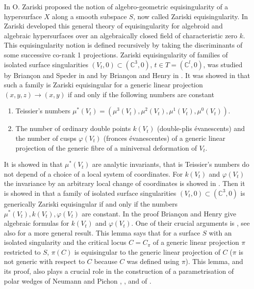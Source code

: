 \documentclass[11pt,a4paper]{amsart}
\newcommand{\1}{{1\!\!1}}
\numberwithin{equation}{section}
\theoremstyle{plain}%
\theoremstyle{definition}
\theoremstyle{definition}
\theoremstyle{remark}
\newcommand{\C}{\mathbb{C}}
\newcommand{\kk}{{k}}
\renewcommand{\1}{\mathbf{1}}
\DeclareMathOperator{\mult}{mult}
\begin{document}
In \cite[Definition 3] {zariski71open} O. Zariski proposed the notion of  algebro-geometric equisingularity of a hypersurface $X$ along a smooth subspace $S$, now called Zariski equisingularity. In \cite{Zariski1979} Zariski developed this general theory of equisingularity for algebroid and  algebraic hypersurfaces over an algebraically closed field of characteristic zero $\kk$.  This equisingularity notion is defined recursively by taking  the discriminants of some successive co-rank 1 projections. 
Zariski equisingularity of families of isolated surface singularities $(V_t,0)\subset (\C^3,0)$, $t\in T=(\C^l,0)$, was studied by Briançon and Speder  in 
\cite{brianconspederthese} and by Briançon and Henry  in \cite{brianconhenry80}. It was showed in \cite[Théorème 3.5.3]{brianconspederthese} that such a family is Zariski equisingular for a generic linear projection $(x,y,z) \to (x,y)$ if and only if the following numbers are constant
\begin{enumerate}[label=(\roman*)]
  \item 
Teissier's numbers $
\mu^*(V_t) = (\mu^3(V_t),\mu^2(V_t),\mu^1(V_t),\mu^0(V_t)). 
$
\item 
The number of ordinary double points $k(V_t)$ (double-plis évanescents) and the number of cusps 
$\varphi (V_t)$ (fronces évanescentes) of a generic linear projection of the generic fibre of a miniversal deformation of $V_t$.  
\end{enumerate}


It is showed in \cite[Proposition 2. 10]{teissierasterisque73} that $\mu^*(V_t)$ are analytic invariants, that is Teissier's numbers do not depend of a choice of a local system of coordinates.  For $k(V_t)$ and $\varphi (V_t)$ the invariance by an arbitrary local change of coordinates is showed in \cite{brianconhenry80}. Then it is showed in \cite[Théorème 4.1]{brianconhenry80} that a family of isolated surface singularities $(V_t,0)\subset (\C^3,0)$ is generically Zariski equisingular if and only if the numbers $\mu^*(V_t), k(V_t), \varphi (V_t)$ are constant.  In the proof Briançon and Henry give algebraic formulas for $ k(V_t)$ and $ \varphi (V_t)$.  One of their crucial arguments is  \cite[Lemme 3.7]{brianconhenry80}, see also \cite[Lemme clé 1.2.2]{teissierRabida82} for a more general result.  This lemma says  that for a surface $S$ with an isolated singularity and the critical locus $C=C_{\pi}$ of a generic linear projection $\pi$ restricted to $S$, $\pi(C)$ is  equisingular to the generic linear  projection of $C$ ($\pi$ is not generic with respect to $C$ because $C$ was defined using $\pi$).  This lemma, and its proof, also plays a crucial role in the construction of a parametrisation of polar wedges of  Neumann and Pichon  \cite{BNP2014}, \cite{NPpreprint}, and of \cite{PP24}.  
\end{document}
